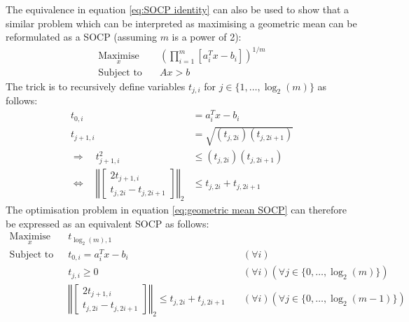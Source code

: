 The equivalence in equation \ref{eq:SOCP identity} can also be used to show that a similar problem which can be interpreted as maximising a geometric mean can be reformulated as a SOCP (assuming $m$ is a power of 2):
\begin{equation}
\begin{aligned}
    \underset{x}{\text{Maximise}} \quad & \left( \prod_{i=1}^{m}\left[ a_i^T x - b_i \right] \right)^{1/m} \\
    \text{Subject to} \quad & Ax > b
\end{aligned} \label{eq:geometric mean SOCP}
\end{equation}
The trick is to recursively define variables $t_{j, i}$ for $j\in\{1,\hdots,\log_2(m)\}$ as follows:
\begin{align*}
    t_{0, i} &= a_i^T x - b_i \\
    t_{j+1, i} &= \sqrt{(t_{j, 2i})(t_{j, 2i+1})} \\
    \Rightarrow \quad t_{j+1, i}^2 &\le (t_{j, 2i})(t_{j, 2i+1}) \\
    \Leftrightarrow \quad \left\Vert\begin{bmatrix}
        2t_{j+1, i} \\
        t_{j, 2i} - t_{j, 2i+1}
    \end{bmatrix}\right\Vert_2 &\le t_{j, 2i} + t_{j, 2i+1}
\end{align*}
The optimisation problem in equation \ref{eq:geometric mean SOCP} can therefore be expressed as an equivalent SOCP as follows:
\begin{equation}
\begin{aligned}
    \underset{x}{\text{Maximise}} \quad & t_{\log_2(m), 1} \\
    \text{Subject to} \quad & t_{0, i} = a_i^T x - b_i \quad & (\forall i) \\
    & t_{j, i} \ge 0 \quad & (\forall i)(\forall j \in \{0, \hdots, \log_2(m)\}) \\
    & \left\Vert\begin{bmatrix}
        2t_{j+1, i} \\
        t_{j, 2i} - t_{j, 2i+1}
    \end{bmatrix}\right\Vert_2 \le t_{j, 2i} + t_{j, 2i+1} \quad & (\forall i)(\forall j \in \{0, \hdots, \log_2(m-1)\}) \\
\end{aligned}
\end{equation}

